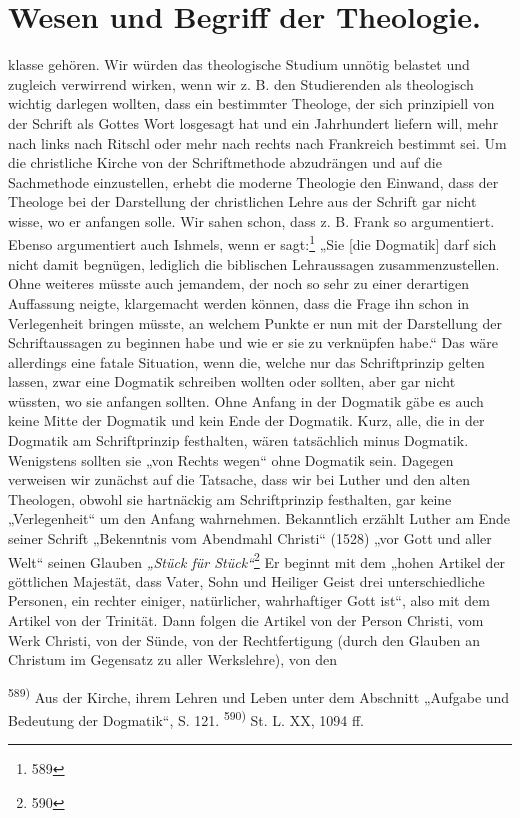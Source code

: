 \section*{Wesen und Begriff der Theologie.}
\setcounter{page}{179}
klasse gehören. Wir würden das theologische Studium unnötig belastet und zugleich verwirrend wirken, wenn wir z. B. den Studierenden als theologisch wichtig darlegen wollten, dass ein bestimmter Theologe, der sich prinzipiell von der Schrift als Gottes Wort losgesagt hat und ein Jahrhundert liefern will, mehr nach links nach Ritschl oder mehr nach rechts nach Frankreich bestimmt sei.
Um die christliche Kirche von der Schriftmethode abzudrängen und auf die Sachmethode einzustellen, erhebt die moderne Theologie den Einwand, dass der Theologe bei der Darstellung der christlichen Lehre aus der Schrift gar nicht wisse, wo er anfangen solle. Wir sahen schon, dass z. B. Frank so argumentiert. Ebenso argumentiert auch Ishmels, wenn er sagt:\footnote{589} „Sie [die Dogmatik] darf sich nicht damit begnügen, lediglich die biblischen Lehraussagen zusammenzustellen. Ohne weiteres müsste auch jemandem, der noch so sehr zu einer derartigen Auffassung neigte, klargemacht werden können, dass die Frage ihn schon in Verlegenheit bringen müsste, an welchem Punkte er nun mit der Darstellung der Schriftaussagen zu beginnen habe und wie er sie zu verknüpfen habe.“ Das wäre allerdings eine fatale Situation, wenn die, welche nur das Schriftprinzip gelten lassen, zwar eine Dogmatik schreiben wollten oder sollten, aber gar nicht wüssten, wo sie anfangen sollten. Ohne Anfang in der Dogmatik gäbe es auch keine Mitte der Dogmatik und kein Ende der Dogmatik. Kurz, alle, die in der Dogmatik am Schriftprinzip festhalten, wären tatsächlich minus Dogmatik. Wenigstens sollten sie „von Rechts wegen“ ohne Dogmatik sein. Dagegen verweisen wir zunächst auf die Tatsache, dass wir bei Luther und den alten Theologen, obwohl sie hartnäckig am Schriftprinzip festhalten, gar keine „Verlegenheit“ um den Anfang wahrnehmen. Bekanntlich erzählt Luther am Ende seiner Schrift „Bekenntnis vom Abendmahl Christi“ (1528) „vor Gott und aller Welt“ seinen Glauben \emph{„Stück für Stück“}\footnote{590} Er beginnt mit dem „hohen Artikel der göttlichen Majestät, dass Vater, Sohn und Heiliger Geist drei unterschiedliche Personen, ein rechter einiger, natürlicher, wahrhaftiger Gott ist“, also mit dem Artikel von der Trinität. Dann folgen die Artikel von der Person Christi, vom Werk Christi, von der Sünde, von der Rechtfertigung (durch den Glauben an Christum im Gegensatz zu aller Werkslehre), von den
\vspace{1em}
\begin{footnotesize}
\noindent\textsuperscript{589)} Aus der Kirche, ihrem Lehren und Leben unter dem Abschnitt „Aufgabe und Bedeutung der Dogmatik“, S. 121.
\noindent\textsuperscript{590)} St. L. XX, 1094 ff.
\end{footnotesize}